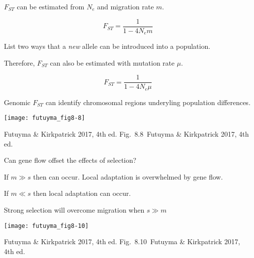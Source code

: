 \documentclass[t]{beamer}
\newcommand{\futuyma}[1]{%
	\ifthenelse{\isempty{#1}}%
	{Futuyma \& Kirkpatrick 2017, 4th ed.}%
	{Fig.~#1~Futuyma \& Kirkpatrick 2017, 4th ed.}%
}
\newcommand{\backskip}{\vspace{-0.5\baselineskip}}
\begin{document}

\begin{frame}{$F_{ST}$ can be estimated from $N_e$ and migration rate $m$.}

\begin{equation*}
F_{ST} = \dfrac{1}{1-4N_em}
\end{equation*}

\pause
\hangpara List two ways that a \emph{new} allele can be introduced into a population.

\pause
\hangpara Therefore, $F_{ST}$ can also be estimated with mutation rate $\mu$.

\begin{equation*}
F_{ST} = \dfrac{1}{1-4N_e\mu}
\end{equation*}



\end{frame}


\begin{frame}{Genomic $F_{ST}$ can identify chromosomal regions underyling population differences.}

\backskip
\centering
\texttt{[image: futuyma\_fig8-8]}

\tinyfill \futuyma{8.8}

\end{frame}


\begin{frame}{Can gene flow offset the effects of selection?}

\hangpara If $m \gg s$ then  can occur. Local adaptation is overwhelmed by gene flow.

\hangpara If $m \ll s$ then local adaptation can occur.

\end{frame}


\begin{frame}{Strong selection will overcome migration when $s \gg m$}

\backskip
\centering
\texttt{[image: futuyma\_fig8-10]}


\tinyfill \futuyma{8.10}
\end{frame}
\end{document}

